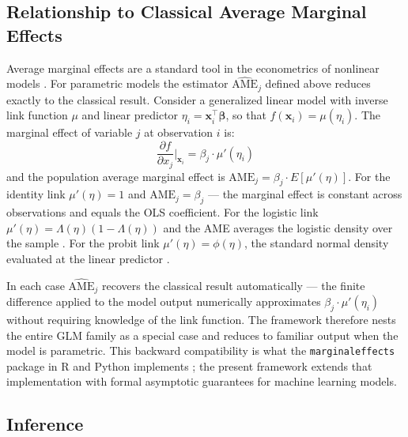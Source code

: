 \documentclass[12pt]{article}
\begin{document}
	\subsection{Relationship to Classical Average Marginal Effects}
	
	Average marginal effects are a standard tool in the econometrics of nonlinear models \citep{greene2012, wooldridge2010}. For parametric models the estimator $\widehat{\mathrm{AME}}_j$ defined above reduces exactly to the classical result. Consider a generalized linear model with inverse link function $\mu$ and linear predictor $\eta_i = \mathbf{x}_i^\top \boldsymbol{\beta}$, so that $f(\mathbf{x}_i) = \mu(\eta_i)$. The marginal effect of variable $j$ at observation $i$ is:
	\begin{equation}
		\frac{\partial f}{\partial x_j}\bigg|_{\mathbf{x}_i} = \beta_j \cdot \mu'(\eta_i)
	\end{equation}
	and the population average marginal effect is $\mathrm{AME}_j = \beta_j \cdot E[\mu'(\eta)]$. For the identity link $\mu'(\eta) = 1$ and $\mathrm{AME}_j = \beta_j$ --- the marginal effect is constant across observations and equals the OLS coefficient. For the logistic link $\mu'(\eta) = \Lambda(\eta)(1 - \Lambda(\eta))$ and the AME averages the logistic density over the sample \citep{greene2012}. For the probit link $\mu'(\eta) = \phi(\eta)$, the standard normal density evaluated at the linear predictor \citep{wooldridge2010}.
	
	In each case $\widehat{\mathrm{AME}}_j$ recovers the classical result automatically --- the finite difference applied to the model output numerically approximates $\beta_j \cdot \mu'(\eta_i)$ without requiring knowledge of the link function. The framework therefore nests the entire GLM family as a special case and reduces to familiar output when the model is parametric. This backward compatibility is what the \texttt{marginaleffects} package in R and Python implements \citep{arelbundock2024marginaleffects}; the present framework extends that implementation with formal asymptotic guarantees for machine learning models.
	
	\subsection{Inference}
	
\end{document}
